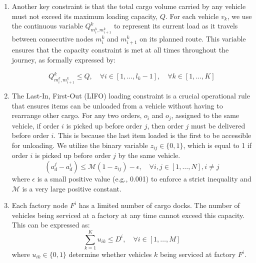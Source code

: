 \documentclass[]{interact}
\begin{document}
\begin{enumerate}
\begin{equation}
    \text{demand}(o^i) = q^i_{\text{standard}} + \frac{1}{2} q^i_{\text{small}} + \frac{1}{4} q^i_{\text{boxes}}
\end{equation}

\begin{equation}
     \text{demand}(o^i) = \sum_{h = 1}^{ \mathcal{H} ^i} \text{demand}(o^i_h)
\end{equation}

\begin{equation}
     0 < \text{demand}(o^i_h) \leq Q , \quad \forall h\in [1 , \dots , \mathcal{H}^i] , \quad \forall i \in [1, \dots , N] 
\end{equation}


    \item Another key constraint is that the total cargo volume carried by any vehicle must not exceed its maximum loading capacity, $Q$. For each vehicle $v_k$, we use the continuous variable $Q^k_{m_i^k , m_{i+1}^k}$ to represent its current load as it travels between consecutive nodes $m_i^k$ and $m_{i+1}^k$ on its planned route. This variable ensures that the capacity constraint is met at all times throughout the journey, as formally expressed by:

\begin{equation}
    Q^k_{m_i^k , m_{i +1}^k} \leq Q , \quad \forall i \in [1 , \dots , l_k - 1] , \quad \forall k \in [1, \dots , K]
\end{equation}

    \item The Last-In, First-Out (LIFO) loading constraint is a crucial operational rule that ensures items can be unloaded from a vehicle without having to rearrange other cargo. For any two orders, $o_i$ and $o_j$, assigned to the same vehicle, if order $i$ is picked up before order $j$, then order $j$ must be delivered before order $i$. This is because the last item loaded is the first to be accessible for unloading. We utilize the binary variable $z_{ij} \in \{0,1\}$, which is equal to 1 if order $i$ is picked up before order $j$ by the same vehicle. 
\begin{equation}
  (a_{d}^j - a_{d}^i) \leq \mathcal{M}(1 - z_{ij}) - \epsilon, \quad \forall i, j \in [1 , \dots , N], i \neq j   
\end{equation}
where $\epsilon$ is a small positive value (e.g., 0.001) to enforce a strict inequality and $\mathcal{M}$ is a very large positive constant.

    \item Each factory node $F^i$ has a limited number of cargo docks. The number of vehicles being serviced at a factory at any time cannot exceed this capacity. This can be expressed as:
\begin{equation}
    \sum_{k = 1}^K u_{i k} \leq D^i, \quad \forall i \in [1 , \dots , M]
\end{equation}
where $ u_{i k} \in \{0 , 1\}$ determine whether vehicles $k$ being serviced at factory $F^i$.


\end{enumerate}
\end{document}
